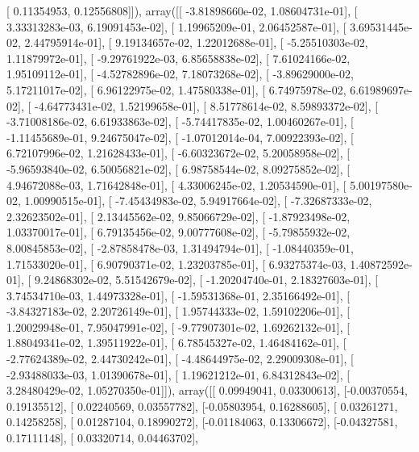 \documentclass{article}
\begin{document}
       [ 0.11354953,  0.12556808]]), array([[ -3.81898660e-02,   1.08604731e-01],
       [  3.33313283e-03,   6.19091453e-02],
       [  1.19965209e-01,   2.06452587e-01],
       [  3.69531445e-02,   2.44795914e-01],
       [  9.19134657e-02,   1.22012688e-01],
       [ -5.25510303e-02,   1.11879972e-01],
       [ -9.29761922e-03,   6.85658838e-02],
       [  7.61024166e-02,   1.95109112e-01],
       [ -4.52782896e-02,   7.18073268e-02],
       [ -3.89629000e-02,   5.17211017e-02],
       [  6.96122975e-02,   1.47580338e-01],
       [  6.74975978e-02,   6.61989697e-02],
       [ -4.64773431e-02,   1.52199658e-01],
       [  8.51778614e-02,   8.59893372e-02],
       [ -3.71008186e-02,   6.61933863e-02],
       [ -5.74417835e-02,   1.00460267e-01],
       [ -1.11455689e-01,   9.24675047e-02],
       [ -1.07012014e-04,   7.00922393e-02],
       [  6.72107996e-02,   1.21628433e-01],
       [ -6.60323672e-02,   5.20058958e-02],
       [ -5.96593840e-02,   6.50056821e-02],
       [  6.98758544e-02,   8.09275852e-02],
       [  4.94672088e-03,   1.71642848e-01],
       [  4.33006245e-02,   1.20534590e-01],
       [  5.00197580e-02,   1.00990515e-01],
       [ -7.45434983e-02,   5.94917664e-02],
       [ -7.32687333e-02,   2.32623502e-01],
       [  2.13445562e-02,   9.85066729e-02],
       [ -1.87923498e-02,   1.03370017e-01],
       [  6.79135456e-02,   9.00777608e-02],
       [ -5.79855932e-02,   8.00845853e-02],
       [ -2.87858478e-03,   1.31494794e-01],
       [ -1.08440359e-01,   1.71533020e-01],
       [  6.90790371e-02,   1.23203785e-01],
       [  6.93275374e-03,   1.40872592e-01],
       [  9.24868302e-02,   5.51542679e-02],
       [ -1.20204740e-01,   2.18327603e-01],
       [  3.74534710e-03,   1.44973328e-01],
       [ -1.59531368e-01,   2.35166492e-01],
       [ -3.84327183e-02,   2.20726149e-01],
       [  1.95744333e-02,   1.59102206e-01],
       [  1.20029948e-01,   7.95047991e-02],
       [ -9.77907301e-02,   1.69262132e-01],
       [  1.88049341e-02,   1.39511922e-01],
       [  6.78545327e-02,   1.46484162e-01],
       [ -2.77624389e-02,   2.44730242e-01],
       [ -4.48644975e-02,   2.29009308e-01],
       [ -2.93488033e-03,   1.01390678e-01],
       [  1.19621212e-01,   6.84312843e-02],
       [  3.28480429e-02,   1.05270350e-01]]), array([[ 0.09949041,  0.03300613],
       [-0.00370554,  0.19135512],
       [ 0.02240569,  0.03557782],
       [-0.05803954,  0.16288605],
       [ 0.03261271,  0.14258258],
       [ 0.01287104,  0.18990272],
       [-0.01184063,  0.13306672],
       [-0.04327581,  0.17111148],
       [ 0.03320714,  0.04463702],
\end{document}
